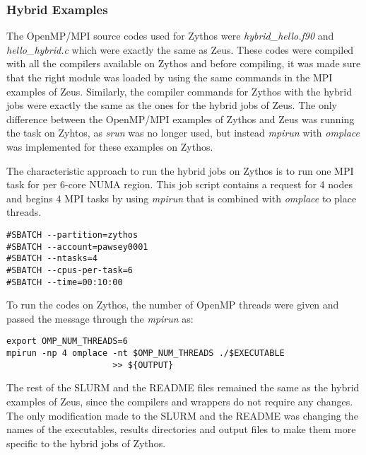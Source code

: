 \subsubsection{Hybrid Examples}

The OpenMP/MPI source codes used for Zythos were \emph{hybrid\_hello.f90} and \emph{hello\_hybrid.c} which were exactly the same as Zeus. These codes 
were compiled with all the compilers available on Zythos and before compiling, it was made sure that the right module was loaded by using the same 
commands in the MPI examples of Zeus. Similarly, the compiler commands for Zythos with the hybrid jobs were exactly the same as the ones for the hybrid 
jobs of Zeus. The only difference between the OpenMP/MPI examples of Zythos and Zeus was running the task on Zyhtos, as \emph{srun} was no longer used, 
but instead \emph{mpirun} with \emph{omplace} was implemented for these examples on Zythos. 

The characteristic approach to run the hybrid jobs on Zythos is to run one MPI task for per 6-core NUMA region. This job script contains a request for 4
nodes and begins 4 MPI tasks by using \emph{mpirun} that is combined with \emph{omplace} to place threads.

\begin{tcolorbox}
\begin{Verbatim}[fontsize=\scriptsize]
#SBATCH --partition=zythos
#SBATCH --account=pawsey0001
#SBATCH --ntasks=4
#SBATCH --cpus-per-task=6
#SBATCH --time=00:10:00
\end{Verbatim}
\end{tcolorbox}

To run the codes on Zythos, the number of OpenMP threads were given and passed the message through the \emph{mpirun} as:

\begin{tcolorbox}
\begin{Verbatim}[fontsize=\scriptsize]
export OMP_NUM_THREADS=6
mpirun -np 4 omplace -nt $OMP_NUM_THREADS ./$EXECUTABLE
					 >> ${OUTPUT}
\end{Verbatim}
\end{tcolorbox}

The rest of the SLURM and the README files remained the same as the hybrid examples of Zeus, since the compilers and wrappers do not require any changes.
The only modification made to the SLURM and the README was changing the names of the executables, results directories and output files to make them more
specific to the hybrid jobs of Zythos.

